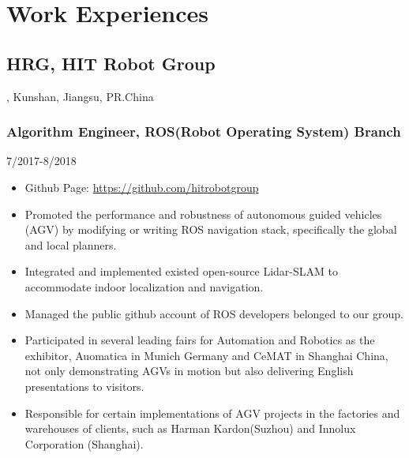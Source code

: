 \documentclass{article}
\begin{document}
\section{Work Experiences}
\subsection{HRG, HIT Robot Group}, Kunshan, Jiangsu, PR.China
\subsubsection{Algorithm Engineer, ROS(Robot Operating System) Branch} \hfill 7/2017-8/2018
\begin{itemize}[noitemsep,topsep=1pt]
\item Github Page: \url{https://github.com/hitrobotgroup}
\item Promoted the performance and robustness of autonomous guided vehicles (AGV) by modifying or writing ROS navigation stack, specifically the global and local planners.
\item Integrated and implemented existed open-source Lidar-SLAM to accommodate indoor localization and navigation.
\item Managed the public github account of ROS developers belonged to our group.  
\item Participated in several leading fairs for Automation and Robotics as the exhibitor, Auomatica in Munich Germany and CeMAT in Shanghai China, not only demonstrating AGVs in motion but also delivering English presentations to visitors. 
\item Responsible for certain implementations of AGV projects in the factories and warehouses of clients, such as Harman Kardon(Suzhou) and Innolux Corporation (Shanghai).  
\end{itemize}

\end{document}
